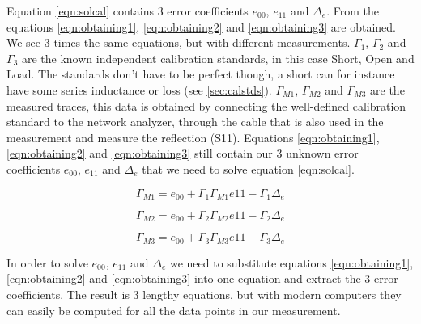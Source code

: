 Equation \ref{eqn:solcal} contains 3 error coefficients $e_{00}$, $e_{11}$ and $\Delta_{e}$. From \cite{agilent_calibration} the equations \ref{eqn:obtaining1}, \ref{eqn:obtaining2} and \ref{eqn:obtaining3} are obtained. We see 3 times the same equations, but with different measurements. $\Gamma_1$, $\Gamma_2$ and $\Gamma_3$ are the known independent calibration standards, in this case Short, Open and Load. The standards don't have to be perfect though, a short can for instance have some series inductance or loss (see \ref{sec:calstds}). $\Gamma_{M1}$, $\Gamma_{M2}$ and $\Gamma_{M3}$ are the measured traces, this data is obtained by connecting the well-defined calibration standard to the network analyzer, through the cable that is also used in the measurement and measure the reflection (S11). Equations \ref{eqn:obtaining1}, \ref{eqn:obtaining2} and \ref{eqn:obtaining3} still contain our 3 unknown error coefficients $e_{00}$, $e_{11}$ and $\Delta_{e}$ that we need to solve equation \ref{eqn:solcal}.

	
	\small
	\begin{equation}
	\label{eqn:obtaining1}
	\Gamma_{M{1}} = e_{00}+\Gamma_{1}\Gamma_{M{1}}e{11}-\Gamma_{1}\Delta_{e}
	\end{equation}

	\begin{equation}
	\label{eqn:obtaining2}
	\Gamma_{M{2}} = e_{00}+\Gamma_{2}\Gamma_{M{2}}e{11}-\Gamma_{2}\Delta_{e}
	\end{equation}

	\begin{equation}
	\label{eqn:obtaining3}
	\Gamma_{M{3}} = e_{00}+\Gamma_{3}\Gamma_{M{3}}e{11}-\Gamma_{3}\Delta_{e}
	\end{equation}
	\normalsize

In order to solve $e_{00}$, $e_{11}$ and $\Delta_{e}$ we need to substitute equations  \ref{eqn:obtaining1}, \ref{eqn:obtaining2} and \ref{eqn:obtaining3} into one equation and extract the 3 error coefficients. The result is 3 lengthy equations, but with modern computers they can easily be computed for all the data points in our measurement.

